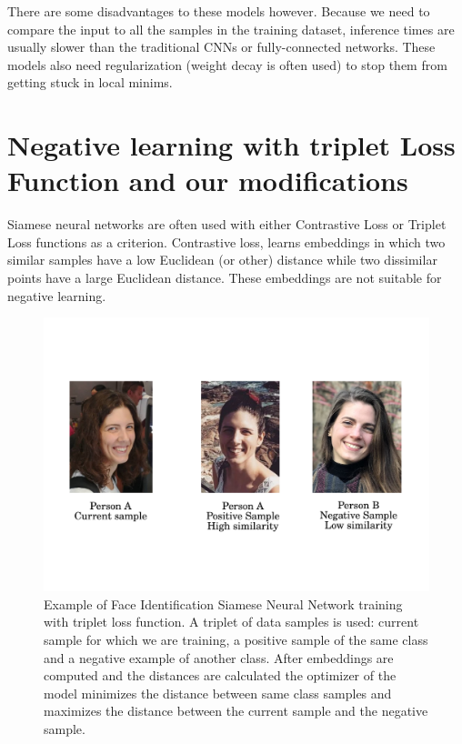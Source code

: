 \documentclass[b5paper]{book}
\begin{document}
There are some disadvantages to these models however. Because we need to compare the input to all the samples in the training dataset, inference times are usually slower than the traditional CNNs or fully-connected networks. These models also need regularization (weight decay is often used) to stop them from getting stuck in local minims. 

\section{Negative learning with triplet Loss Function and our modifications}

Siamese neural networks are often used with either Contrastive Loss or Triplet Loss functions as a criterion. Contrastive loss, learns embeddings in which two similar samples have a low Euclidean (or other) distance while two dissimilar points have a large Euclidean distance. These embeddings are not suitable for negative learning.

\begin{figure}
    \centering
    \includegraphics[trim=0.5cm 2.6cm 0.5cm 5cm,scale=0.73]{figures/siamese.pdf}
    \caption{Example of Face Identification Siamese Neural Network training with triplet loss function. A triplet of data samples is used: current sample for which we are training, a positive sample of the same class and a negative example of another class. After embeddings are computed and the distances are calculated the optimizer of the model minimizes the distance between same class samples and maximizes the distance between the current sample and the negative sample.}
    \label{fig:siamese}
\end{figure}
\end{document}
